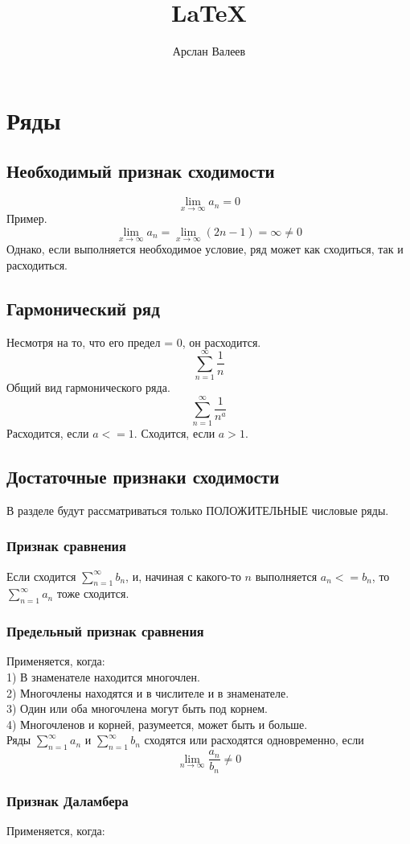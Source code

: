 \documentclass[12pt,a4paper]{article}
\title{\LaTeX}
\date{}
\author{Арслан Валеев}
\begin{document}
\section{Ряды}
\subsection{Необходимый признак сходимости}
\[ \lim_{x \to \infty}a_n=0 \]
Пример.
\[ 
\lim_{x \to \infty}a_n
=\lim_{x \to \infty}(2n-1)
=\infty \neq 0
\]
Однако, если выполняется необходимое условие, ряд может как сходиться, так и расходиться.
\subsection{Гармонический ряд}
Несмотря на то, что его предел = 0, он расходится.
\[ \sum_{n=1}^{\infty} \frac{1}{n} \]
Общий вид гармонического ряда.
\[ \sum_{n=1}^{\infty} \frac{1}{n^a} \]
Расходится, если $ a<=1 $.
Сходится, если $ a>1 $.
\subsection{Достаточные признаки сходимости}
В разделе будут рассматриваться только ПОЛОЖИТЕЛЬНЫЕ числовые ряды.
\subsubsection{Признак сравнения}
Если сходится $ \sum_{n=1}^{\infty} b_n $, и, начиная с какого-то $ n $ выполняется $ a_n <= b_n $, то $ \sum_{n=1}^{\infty} a_n $ тоже сходится.
\subsubsection{Предельный признак сравнения}
Применяется, когда: \\
1) В знаменателе находится многочлен.\\
2) Многочлены находятся и в числителе и в знаменателе.\\
3) Один или оба многочлена могут быть под корнем.\\
4) Многочленов и корней, разумеется, может быть и больше.\\

Ряды $ \sum_{n=1}^{\infty} a_n $ и $ \sum_{n=1}^{\infty} b_n $ сходятся или расходятся одновременно, если
\[ \lim_{n \to \infty} \frac{a_n}{b_n} \neq 0 \]
\subsubsection{Признак Даламбера}
Применяется, когда:
\end{document}
